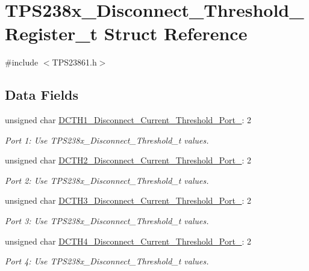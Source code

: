 \hypertarget{struct_t_p_s238x___disconnect___threshold___register__t}{\section{T\-P\-S238x\-\_\-\-Disconnect\-\_\-\-Threshold\-\_\-\-Register\-\_\-t Struct Reference}
\label{struct_t_p_s238x___disconnect___threshold___register__t}
}


{\ttfamily \#include $<$T\-P\-S23861.\-h$>$}

\subsection*{Data Fields}
\begin{DoxyCompactItemize}
\item 
unsigned char \hyperlink{struct_t_p_s238x___disconnect___threshold___register__t_ab5c99a4c2b09787945bcf9a5830098f3}{D\-C\-T\-H1\-\_\-\-Disconnect\-\_\-\-Current\-\_\-\-Threshold\-\_\-\-Port\-\_}\-: 2
\begin{DoxyCompactList}\small\item\em Port 1\-: Use T\-P\-S238x\-\_\-\-Disconnect\-\_\-\-Threshold\-\_\-t values. \end{DoxyCompactList}\item 
unsigned char \hyperlink{struct_t_p_s238x___disconnect___threshold___register__t_a9e270b5f02873c55dfdc25a9479239fb}{D\-C\-T\-H2\-\_\-\-Disconnect\-\_\-\-Current\-\_\-\-Threshold\-\_\-\-Port\-\_}\-: 2
\begin{DoxyCompactList}\small\item\em Port 2\-: Use T\-P\-S238x\-\_\-\-Disconnect\-\_\-\-Threshold\-\_\-t values. \end{DoxyCompactList}\item 
unsigned char \hyperlink{struct_t_p_s238x___disconnect___threshold___register__t_acd5ff97d259f4a27a8a76570006d80f8}{D\-C\-T\-H3\-\_\-\-Disconnect\-\_\-\-Current\-\_\-\-Threshold\-\_\-\-Port\-\_}\-: 2
\begin{DoxyCompactList}\small\item\em Port 3\-: Use T\-P\-S238x\-\_\-\-Disconnect\-\_\-\-Threshold\-\_\-t values. \end{DoxyCompactList}\item 
unsigned char \hyperlink{struct_t_p_s238x___disconnect___threshold___register__t_a5653ac33e0a356e9bd1652fd91f9d2a0}{D\-C\-T\-H4\-\_\-\-Disconnect\-\_\-\-Current\-\_\-\-Threshold\-\_\-\-Port\-\_}\-: 2
\begin{DoxyCompactList}\small\item\em Port 4\-: Use T\-P\-S238x\-\_\-\-Disconnect\-\_\-\-Threshold\-\_\-t values. \end{DoxyCompactList}\end{DoxyCompactItemize}


